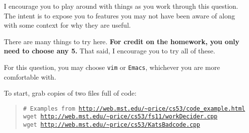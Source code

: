 \documentclass{article}
\begin{document}
\medskip
\noindent
I encourage you to play around with things as you work through this question.
The intent is to expose you to features you may not have been aware of along
with some context for why they are useful.

\medskip
\noindent
There are many things to try here.
\textbf{For credit on the homework, you only need to choose any 5.}
That said, I encourage you to try all of these.

\medskip
\noindent
For this question, you may choose \texttt{vim} or \texttt{Emacs}, whichever
you are more comfortable with.

\medskip
\noindent
To start, grab copies of two files full of code:
\begin{quote}
  \texttt{\# Examples from \url{http://web.mst.edu/~price/cs53/code_example.html}}\\
  \texttt{wget \url{http://web.mst.edu/~price/cs53/fs11/workDecider.cpp}}\\
  \texttt{wget \url{http://web.mst.edu/~price/cs53/KatsBadcode.cpp}}
\end{quote}
\end{document}
